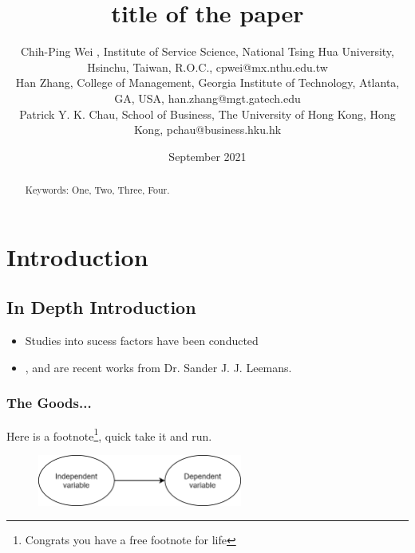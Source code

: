 \documentclass{sis-dc}
\title{title of the paper}
\author{
Chih-Ping Wei \orcidlink{0000-0000-0000-0001}, Institute of Service Science, National Tsing Hua University, Hsinchu, Taiwan, R.O.C., cpwei@mx.nthu.edu.tw
\\
Han Zhang, College of Management, Georgia Institute of Technology, Atlanta, GA, USA, han.zhang@mgt.gatech.edu
\\
Patrick Y. K. Chau, School of Business, The University of Hong Kong, Hong Kong, pchau@business.hku.hk
}
\date{September 2021}
\theoremstyle{definition}
\begin{document}
\maketitle[s]


\begin{abstract}
    \lipsum[3]
    
    \lipsum[5]
    
    Keywords: One, Two, Three, Four.
\end{abstract}

\clearpage

\section{Introduction}

\lipsum[1]

\subsection{In Depth Introduction}

\lipsum[2]

\begin{itemize}
    \item Studies into sucess factors have been conducted \citep{DBLP:journals/bpmj/BandaraGTR21}
    \item \cite{DBLP:journals/is/LeemansABP21}, \cite{DBLP:journals/kais/LeemansF20} and \cite{DBLP:conf/apn/BurkeLW21} are recent works from Dr. Sander J. J. Leemans.
\end{itemize}

\subsubsection{The Goods...}

\lipsum[3]
Here is a footnote\footnote{Congrats you have a free footnote for life}, quick take it and run.

\begin{figure}[t]
    \includegraphics[width=0.6\textwidth]{sis-dc-example.png}
    \caption{ \lipsum[7] }
    \label{fig:my_label}
\end{figure}
\end{document}
